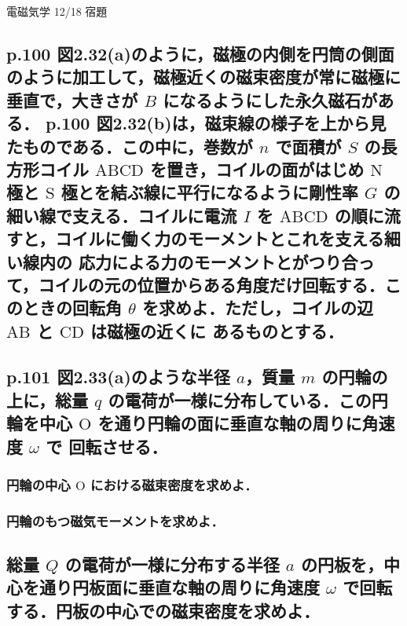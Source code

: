 \documentclass[a4paper, 12pt]{bxjsarticle}
\begin{document}
\begin{center}
    \begin{huge}
        電磁気学 12/18 宿題
    \end{huge}
\end{center}

\subsection{p.100 図2.32(a)のように，磁極の内側を円筒の側面のように加工して，磁極近くの磁束密度が常に磁極に垂直で，大きさが \(B\) になるようにした永久磁石がある．%
p.100 図2.32(b)は，磁束線の様子を上から見たものである．この中に，巻数が \(n\) で面積が \(S\) の長方形コイル \(\mathrm{ABCD}\) を置き，コイルの面がはじめ \(\mathrm{N}\) 極と%
\(\mathrm{S}\) 極とを結ぶ線に平行になるように剛性率 \(G\) の細い線で支える．コイルに電流 \(I\) を \(\mathrm{ABCD}\) の順に流すと，コイルに働く力のモーメントとこれを支える細い線内の%
応力による力のモーメントとがつり合って，コイルの元の位置からある角度だけ回転する．このときの回転角 \(\theta\) を求めよ．ただし，コイルの辺 \(\mathrm{AB}\) と \(\mathrm{CD}\) は磁極の近くに%
あるものとする．}
\newpage
\begin{samepage}
\subsection{p.101 図2.33(a)のような半径 \(a\)，質量 \(m\) の円輪の上に，総量 \(q\) の電荷が一様に分布している．この円輪を中心 \(\mathrm{O}\) を通り円輪の面に垂直な軸の周りに角速度 \(\omega\) で%
回転させる．}
\subsubsection{円輪の中心 \(\mathrm{O}\) における磁束密度を求めよ．}
\vspace{10em}
\subsubsection{円輪のもつ磁気モーメントを求めよ．}
\vspace{10em}
\subsection{総量 \(Q\) の電荷が一様に分布する半径 \(a\) の円板を，中心を通り円板面に垂直な軸の周りに角速度 \(\omega\) で回転する．円板の中心での磁束密度を求めよ．}
\vspace{20em}
\end{samepage}
\end{document}
